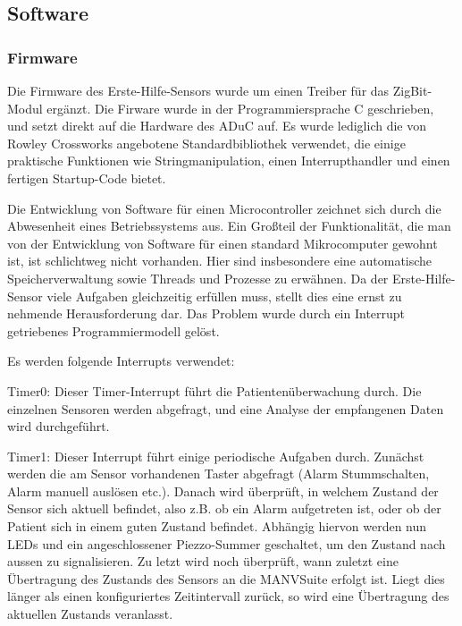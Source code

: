 \subsection{Software}

\subsubsection{Firmware}
Die Firmware des Erste-Hilfe-Sensors wurde um einen Treiber für das ZigBit-Modul ergänzt. Die Firware wurde in der
Programmiersprache C geschrieben, und setzt direkt auf die Hardware des ADuC auf. Es wurde lediglich die von 
Rowley Crossworks angebotene Standardbibliothek verwendet, die einige praktische Funktionen wie Stringmanipulation,
einen Interrupthandler und einen fertigen Startup-Code bietet.

Die Entwicklung von Software für einen Microcontroller zeichnet sich durch die Abwesenheit eines Betriebssystems 
aus. Ein Großteil der Funktionalität, die man von der Entwicklung von Software für einen standard Mikrocomputer 
gewohnt ist, ist schlichtweg nicht vorhanden. Hier sind insbesondere eine automatische Speicherverwaltung sowie
Threads und Prozesse zu erwähnen. Da der Erste-Hilfe-Sensor viele Aufgaben gleichzeitig erfüllen muss, stellt 
dies eine ernst zu nehmende Herausforderung dar. Das Problem wurde durch ein Interrupt getriebenes Programmiermodell
gelöst.

Es werden folgende Interrupts verwendet:

Timer0: Dieser Timer-Interrupt führt die Patientenüberwachung durch. Die einzelnen Sensoren werden abgefragt,
und eine Analyse der empfangenen Daten wird durchgeführt.

Timer1: Dieser Interrupt führt einige periodische Aufgaben durch. Zunächst werden die am Sensor vorhandenen
Taster abgefragt (Alarm Stummschalten, Alarm manuell auslösen etc.). Danach wird überprüft, in welchem Zustand
der Sensor sich aktuell befindet, also z.B. ob ein Alarm aufgetreten ist, oder ob der Patient sich in einem
guten Zustand befindet. Abhängig hiervon werden nun LEDs und ein angeschlossener Piezzo-Summer geschaltet,
um den Zustand nach aussen zu signalisieren. Zu letzt wird noch überprüft, wann zuletzt eine Übertragung
des Zustands des Sensors an die MANVSuite erfolgt ist. Liegt dies länger als einen konfiguriertes Zeitintervall
zurück, so wird eine Übertragung des aktuellen Zustands veranlasst.


